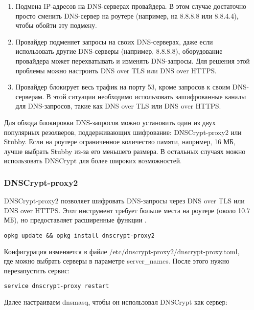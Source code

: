 \begin{enumerate}
    \item Подмена IP-адресов на DNS-серверах провайдера. В этом случае достаточно просто сменить DNS-сервер на роутере (например, на 8.8.8.8 или 8.8.4.4), чтобы обойти эту подмену.

    \item Провайдер подменяет запросы на своих DNS-серверах, даже если использовать другие DNS-серверы (например, 8.8.8.8), оборудование провайдера может перехватывать и изменять DNS-запросы. Для решения этой проблемы можно настроить DNS over TLS или DNS over HTTPS.

    \item Провайдер блокирует весь трафик на порту 53, кроме запросов к своим DNS-серверам. В этой ситуации необходимо использовать зашифрованные каналы для DNS-запросов, такие как DNS over TLS или DNS over HTTPS.
\end{enumerate}

Для обхода блокировки DNS-запросов можно установить один из двух популярных резолверов, поддерживающих шифрование: DNSCrypt-proxy2 или Stubby. Если на роутере ограниченное количество памяти, например, 16 МБ, лучше выбрать Stubby из-за его меньшего размера. В остальных случаях можно использовать DNSCrypt для более широких возможностей.

\subsubsection*{DNSCrypt-proxy2}

DNSCrypt-proxy2 позволяет шифровать DNS-запросы через DNS over TLS или DNS over HTTPS. Этот инструмент требует больше места на роутере (около 10.7 МБ), но предоставляет расширенные функции \cite{dnscrypt}.

\begin{lstlisting}[frame=rlbt]
opkg update && opkg install dnscrypt-proxy2
\end{lstlisting}

Конфигурация изменяется в файле /etc/dnscrypt-proxy2/dnscrypt-proxy.toml, где можно выбрать серверы в параметре server\_names. После этого нужно перезапустить сервис:

\begin{lstlisting}[frame=rlbt]
service dnscrypt-proxy restart
\end{lstlisting}

Далее настраиваем dnsmasq, чтобы он использовал DNSCrypt как сервер:


